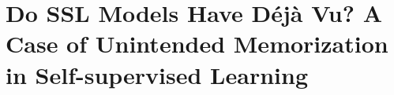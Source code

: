 \graphicspath{{./chapters/chapter1}}
\chapter{Do SSL Models Have Déjà Vu? A Case of Unintended Memorization in Self-supervised Learning} 









